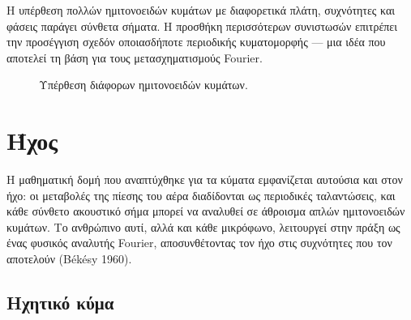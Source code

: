 \documentclass[a4paper, 11pt]{article}
\begin{document}
Η υπέρθεση πολλών ημιτονοειδών κυμάτων με διαφορετικά πλάτη, συχνότητες
και φάσεις παράγει σύνθετα σήματα. Η προσθήκη περισσότερων συνιστωσών
επιτρέπει την προσέγγιση σχεδόν οποιασδήποτε περιοδικής κυματομορφής ---
μια ιδέα που αποτελεί τη βάση για τους μετασχηματισμούς Fourier.

\begin{figure}[htbp]
\centering
{}
\caption{
Υπέρθεση διάφορων ημιτονοειδών κυμάτων.
}
\label{fig:fourier_superposition}
\end{figure}

\section{Ήχος}\label{ux3aeux3c7ux3bfux3c2}

Η μαθηματική δομή που αναπτύχθηκε για τα κύματα εμφανίζεται αυτούσια και
στον ήχο: οι μεταβολές της πίεσης του αέρα διαδίδονται ως περιοδικές
ταλαντώσεις, και κάθε σύνθετο ακουστικό σήμα μπορεί να αναλυθεί σε
άθροισμα απλών ημιτονοειδών κυμάτων. Το ανθρώπινο αυτί, αλλά και κάθε
μικρόφωνο, λειτουργεί στην πράξη ως ένας φυσικός αναλυτής Fourier,
αποσυνθέτοντας τον ήχο στις συχνότητες που τον αποτελούν (Békésy 1960).

\subsection{Ηχητικό
κύμα}\label{ux3b7ux3c7ux3b7ux3c4ux3b9ux3baux3cc-ux3baux3cdux3bcux3b1}
\end{document}

